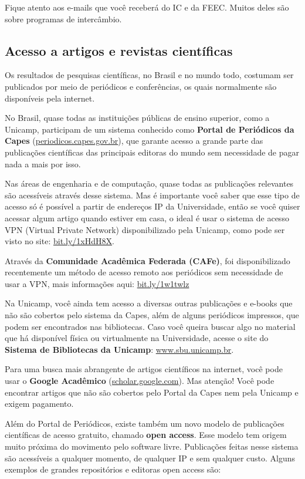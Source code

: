 Fique atento aos e-mails que você receberá do IC e da FEEC. Muitos deles são
sobre programas de intercâmbio.

\subsection{Acesso a artigos e revistas científicas}

Os resultados de pesquisas científicas, no Brasil e no mundo todo, costumam ser
publicados por meio de periódicos e conferências, os quais normalmente são
disponíveis pela internet.

No Brasil, quase todas as instituições públicas de ensino superior, como a
Unicamp, participam de um sistema conhecido como \textbf{Portal de Periódicos da
Capes} (\url{periodicos.capes.gov.br}), que garante acesso a grande parte das
publicações científicas das principais editoras do mundo sem necessidade de
pagar nada a mais por isso.

Nas áreas de engenharia e de computação, quase todas as publicações relevantes
são acessíveis através desse sistema. Mas é importante você saber que esse tipo
de acesso só é possível a partir de endereços IP da Universidade, então se você
quiser acessar algum artigo quando estiver em casa, o ideal é usar o sistema de
acesso VPN (Virtual Private Network) disponibilizado pela Unicamp, como pode ser
visto no site: \url{bit.ly/1xHdH8X}.

Através da \textbf{Comunidade Acadêmica Federada (CAFe)}, foi disponibilizado
recentemente um método de acesso remoto aos periódicos sem necessidade de usar a
VPN, mais informações aqui: \url{bit.ly/1w1twlz}

Na Unicamp, você ainda tem acesso a diversas outras publicações e e-books que
não são cobertos pelo sistema da Capes, além de alguns periódicos impressos, que
podem ser encontrados nas bibliotecas. Caso você queira buscar algo no material
que há disponível física ou virtualmente na Universidade, acesse o site do
\textbf{Sistema de Bibliotecas da Unicamp}: \url{www.sbu.unicamp.br}.

Para uma busca mais abrangente de artigos científicos na internet, você pode
usar o \textbf{Google Acadêmico} (\url{scholar.google.com}). Mas atenção! Você
pode encontrar artigos que não são cobertos pelo Portal da Capes nem pela
Unicamp e exigem pagamento.

Além do Portal de Periódicos, existe também um novo modelo de publicações
científicas de acesso gratuito, chamado \textbf{open access}. Esse modelo tem
origem muito próxima do movimento pelo software livre. Publicações feitas nesse
sistema são acessíveis a qualquer momento, de qualquer IP e sem qualquer custo.
Alguns exemplos de grandes repositórios e editoras open access são:

